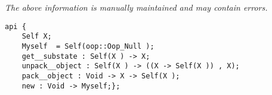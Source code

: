 \label{api:Root\_Object}

{\tiny \it The above information is manually maintained and may contain errors.}
\begin{verbatim}
api {
    Self X;
    Myself  = Self(oop::Oop_Null );
    get__substate : Self(X ) -> X;
    unpack__object : Self(X ) -> ((X -> Self(X )) , X);
    pack__object : Void -> X -> Self(X );
    new : Void -> Myself;};
\end{verbatim}

